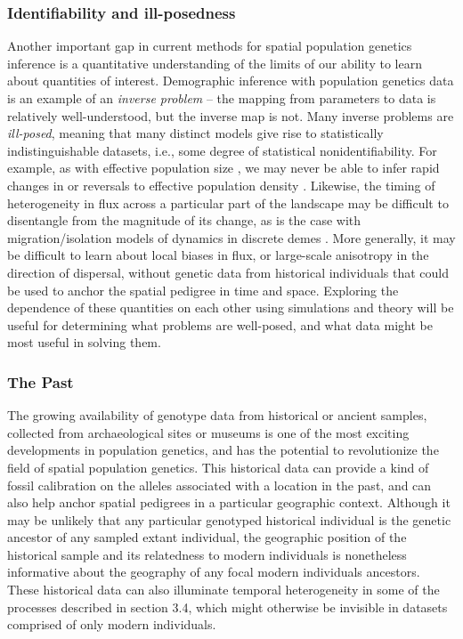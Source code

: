 \documentclass{ar-1col}
\renewcommand{\emph}[1]{{\textit{#1}}}
\begin{document}
\subsubsection{Identifiability and ill-posedness}

Another important gap in current methods for spatial population genetics inference 
is a quantitative understanding of the limits of our ability to learn about 
quantities of interest.
Demographic inference with population genetics data
is an example of an \emph{inverse problem} --
the mapping from parameters to data is relatively well-understood,
but the inverse map is not.
Many inverse problems are \emph{ill-posed},
meaning that many distinct models give rise to statistically indistinguishable datasets,
i.e., some degree of statistical nonidentifiability.
For example, 
as with effective population size \citep{Myers2008},
we may never be able to infer rapid changes in 
or reversals to effective population density
\citep[although see also][]{BhaskarSong2014descartes}.
Likewise, 
the timing of heterogeneity in flux across a particular part of the landscape 
may be difficult to disentangle from the magnitude of its change, 
as is the case with migration/isolation models 
of dynamics in discrete demes \citep{sousa2011nonidentifiability}.
More generally,
it may be difficult to learn about local biases in flux, 
or large-scale anisotropy in the direction of dispersal,
without genetic data from historical individuals 
that could be used to anchor the spatial pedigree 
in time and space.
Exploring the dependence of these quantities on each other 
using simulations and theory 
will be useful for determining what problems are well-posed, 
and what data might be most useful in solving them.


\subsubsection{The Past} 

The growing availability of genotype data from historical or ancient samples, 
collected from archaeological sites or museums 
is one of the most exciting developments in population genetics, 
and has the potential to revolutionize the field of spatial population genetics.
This historical data can provide a kind of fossil calibration on 
the alleles associated with a location in the past, 
and can also help anchor spatial pedigrees in a particular geographic context.
Although it may be unlikely that any particular genotyped historical individual 
is the genetic ancestor of any sampled extant individual, 
the geographic position of the historical sample and its 
relatedness to modern individuals is nonetheless informative 
about the geography of any focal modern individuals ancestors.
These historical data can also illuminate temporal heterogeneity 
in some of the processes described in section 3.4, 
which might otherwise be invisible in datasets comprised of only modern individuals.
\end{document}
